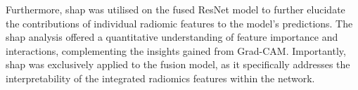 Furthermore, \ac{shap} was utilised on the fused ResNet model to further elucidate the contributions of individual radiomic features to the model's predictions. The \ac{shap} analysis offered a quantitative understanding of feature importance and interactions, complementing the insights gained from Grad-CAM. Importantly, \ac{shap} was exclusively applied to the fusion model, as it specifically addresses the interpretability of the integrated radiomics features within the network.
    

